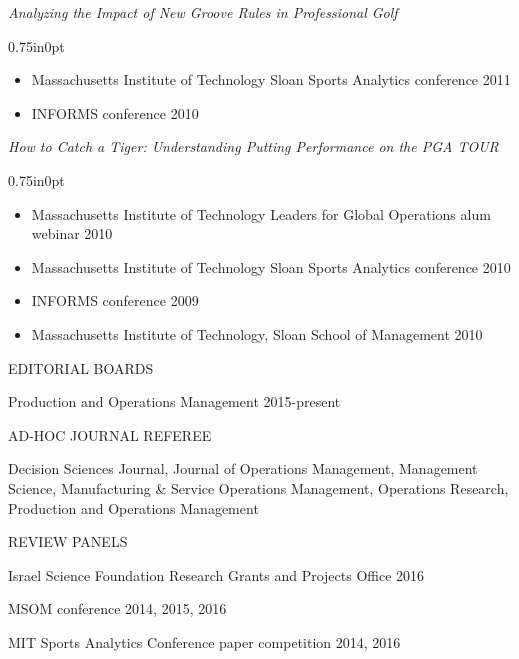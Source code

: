 \documentclass[letterpaper,11pt,oneside]{article}
\newcommand\myIndent{0.75in}
\newcommand\myParSkip{3pt}
\newcommand\myHangIndent{1in}
\newcommand\mySpaceBeforeSection{0.9em}
\newcommand{\NiceIndent}{ \parindent=\myIndent \hangindent=\myHangIndent }
\newenvironment{miniListBullet}
    {
        \begin{adjustwidth}{\myIndent}{0pt}
        \setlength{\parskip}{0pt}%
        \renewcommand\labelitemi{{\boldmath$\cdot$}}
        \begin{itemize}
        \setlength\itemsep{0em}
    }
    {
        \end{itemize}
        \setlength{\parskip}{\myParSkip}%
        \end{adjustwidth}
    }
\begin{document}
\NiceIndent \textit{Analyzing the Impact of New Groove Rules in Professional Golf}
\begin{miniListBullet}
    \item Massachusetts Institute of Technology Sloan Sports Analytics conference 2011
    \item INFORMS conference 2010
\end{miniListBullet}



\NiceIndent \textit{How to Catch a Tiger: Understanding Putting Performance on the PGA TOUR}
\begin{miniListBullet}
    \item Massachusetts Institute of Technology Leaders for Global Operations alum webinar 2010
    \item Massachusetts Institute of Technology Sloan Sports Analytics conference 2010
    \item INFORMS conference 2009
    \item Massachusetts Institute of Technology, Sloan School of Management 2010
\end{miniListBullet}



\vspace{\mySpaceBeforeSection}
\noindent EDITORIAL BOARDS

\NiceIndent Production and Operations Management 2015-present

\vspace{\mySpaceBeforeSection}
\noindent AD-HOC JOURNAL REFEREE

\NiceIndent Decision Sciences Journal, Journal of Operations Management, Management Science, Manufacturing \& Service Operations Management, Operations Research, Production and Operations Management

\vspace{\mySpaceBeforeSection}
\noindent REVIEW PANELS


\NiceIndent Israel Science Foundation Research Grants and Projects Office 2016

\NiceIndent MSOM conference 2014, 2015, 2016

\NiceIndent MIT Sports Analytics Conference paper competition 2014, 2016
\end{document}
